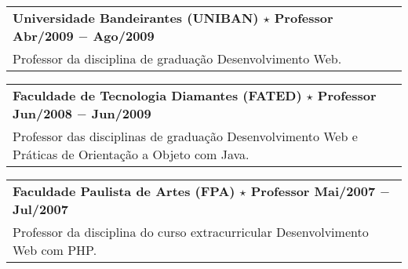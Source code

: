 \documentclass[a4paper, oneside, final]{scrartcl}
\newcommand{\vspc}{\vspace{0.15cm}} %
\begin{document}
\begin{center}
\begin{tabularx}{1\linewidth}{X}
{\bf Universidade Bandeirantes (UNIBAN) $\star$ Professor \hfill Abr/2009 $-$ Ago/2009} \\
Professor da disciplina de graduação Desenvolvimento Web. \vspc\\
\end{tabularx}

\begin{tabularx}{1\linewidth}{X}
{\bf Faculdade de Tecnologia Diamantes (FATED) $\star$ Professor \hfill Jun/2008 $-$ Jun/2009} \\
Professor das disciplinas de graduação Desenvolvimento Web e Práticas de Orientação a Objeto com Java. \vspc\\
\end{tabularx}

\begin{tabularx}{1\linewidth}{X}
{\bf Faculdade Paulista de Artes (FPA) $\star$ Professor  \hfill Mai/2007 $-$ Jul/2007} \\
Professor da disciplina do curso extracurricular Desenvolvimento Web com PHP. \vspc\\
\end{tabularx}


\end{center}
\end{document}
